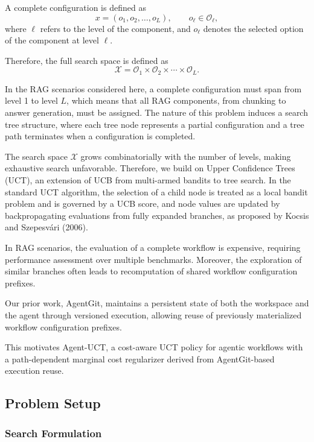 \documentclass{article}
\begin{document}
A complete configuration is defined as 
\[
x = (o_1, o_2, \dots, o_L), \qquad o_\ell \in \mathcal{O}_\ell,
\]
where $\ell$ refers to the level of the component, and $o_\ell$ denotes the selected option of the component at level $\ell$.

Therefore, the full search space is defined as 
\[
\mathcal{X} = \mathcal{O}_1 \times \mathcal{O}_2 \times \cdots \times \mathcal{O}_L .
\]

In the RAG scenarios considered here, a complete configuration must span from level 1 to level $L$, which means that all RAG components, from chunking to answer generation, must be assigned. The nature of this problem induces a search tree structure, where each tree node represents a partial configuration and a tree path terminates when a configuration is completed.

The search space $\mathcal{X}$ grows combinatorially with the number of levels, making exhaustive search unfavorable. Therefore, we build on Upper Confidence Trees (UCT), an extension of UCB from multi-armed bandits to tree search. In the standard UCT algorithm, the selection of a child node is treated as a local bandit problem and is governed by a UCB score, and node values are updated by backpropagating evaluations from fully expanded branches, as proposed by Kocsis and Szepesvári (2006).

In RAG scenarios, the evaluation of a complete workflow is expensive, requiring performance assessment over multiple benchmarks. Moreover, the exploration of similar branches often leads to recomputation of shared workflow configuration prefixes.

Our prior work, AgentGit, maintains a persistent state of both the workspace and the agent through versioned execution, allowing reuse of previously materialized workflow configuration prefixes.

This motivates Agent-UCT, a cost-aware UCT policy for agentic workflows with a path-dependent marginal cost regularizer derived from AgentGit-based execution reuse.

\subsection{Problem Setup}


\subsubsection{Search Formulation}
\end{document}
